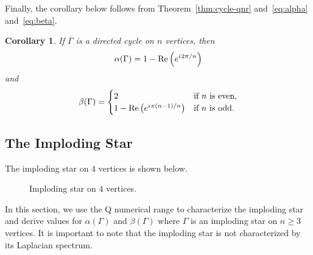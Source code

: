 \documentclass{article}
\newtheorem{corollary}[theorem]{Corollary}
\theoremstyle{definition}
\newcommand{\iu}{{i\mkern1mu}}
\newcommand\re[1]{\operatorname{Re}\left(#1\right)}
\begin{document}
Finally, the corollary below follows from Theorem~\ref{thm:cycle-qnr} and~\eqref{eq:alpha} and~\eqref{eq:beta}.
\begin{corollary}\label{cor:cycle-alpha-beta}
If $\Gamma$ is a directed cycle on $n$ vertices, then
\[
\alpha(\Gamma) = 1-\re{e^{\iu 2\pi/n}}
\]
and
\[
\beta(\Gamma) = \begin{cases} 
				2 & \text{if $n$ is even}, \\
				1 - \re{e^{\iu \pi (n-1)/n}} & \text{if $n$ is odd}.
				\end{cases}
\]
\end{corollary}

\subsection{The Imploding Star}
The imploding star on $4$ vertices is shown below.
\begin{figure}[ht]
\centering
{}
\caption{Imploding star on $4$ vertices.}
\label{fig:imp-star}
\end{figure}
In this section, we use the Q numerical range to characterize the imploding star and derive values for $\alpha(\Gamma)$ and $\beta(\Gamma)$ where $\Gamma$ is an imploding star on $n\geq 3$ vertices.
It is important to note that the imploding star is not characterized by its Laplacian spectrum. 
\end{document}
